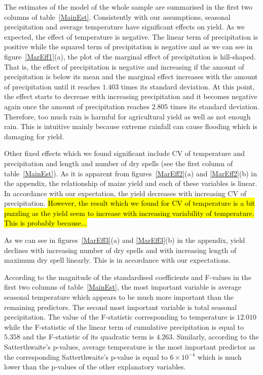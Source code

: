 \documentclass[12pt]{iopart}
\begin{document}
The estimates of the model of the whole sample are summarised in the first two columns of table~\ref{MainEst}. Consistently with our assumptions, seasonal precipitation and average temperature have significant effects on yield. As we expected, the effect of temperature is negative. The linear term of precipitation is positive while the squared term of precipitation is negative and as we can see in figure~\ref{MarEff1}(a), the plot of the marginal effect of precipitation is hill-shaped. That is, the effect of precipitation is negative and increasing if the amount of precipitation is below its mean and the marginal effect increases with the amount of precipitation until it reaches $1.403$ times its standard deviation. At this point, the effect starts to decrease with increasing precipitation and it becomes negative again once the amount of precipitation reaches $2.805$ times its standard deviation. Therefore, too  much rain is harmful for agricultural yield as well as not enough rain. This is intuitive mainly because extreme rainfall can cause flooding which is damaging for yield.



Other fixed effects which we found significant include CV of temperature and precipitation and length and number of dry spells (see the first column of table~\ref{MainEst}). As it is apparent from figures~\ref{MarEff2}(a) and \ref{MarEff2}(b) in the appendix, the relationship of maize yield and each of these variables is linear. In accordance with our expectation, the yield decreases with increasing CV of precipitation. \hl{However, the result which we found for CV of temperature is a bit puzzling as the yield seem to increase with increasing variability of temperature. This is probably because...}


As we can see in figures~\ref{MarEff3}(a) and \ref{MarEff3}(b) in the appendix, yield declines with increasing number of dry spells and with increasing length of maximum dry spell linearly. This is in accordance with our expectations.

According to the magnitude of the standardised coefficients and F-values in the first two columns of table~\ref{MainEst}, the most important variable is average seasonal temperature which appears to be much more important than the remaining predictors. The second most important variable is total seasonal precipitation. The value of the F-statistic corresponding to temperature is $12.010$ while the F-statistic of the linear term of cumulative precipitation is equal to $5.358$ and the F-statistic of its quadratic term is $4.263$. Similarly, according to the Satterthwaite's p-values, average temperature is the most important predictor as the corresponding Satterthwaite's p-value is equal to $6\times10^{-4}$ which is much lower than the p-values of the other explanatory variables.
\end{document}
